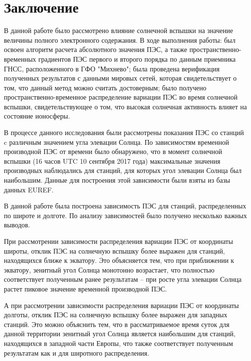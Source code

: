 \documentclass[a4paper]{article}
\begin{document}
\clearpage
\newpage
\section{Заключение}
В данной работе было рассмотрено влияние солнечной вспышки на значение величины полного электронного содержания. В ходе выполнения работы: был освоен алгоритм расчета абсолютного значения ПЭС, а также пространственно-временных градиентов ПЭС первого и второго порядка по данным приемника ГНСС, расположенного в ГФО "Михнево"; была проведена верификация полученных результатов с данными мировых сетей, которая свидетельствует о том, что данный метод можно считать достоверным; было получено пространственно-временное распределение вариации ПЭС во время солнечной вспышки, свидетельствующее о том, что высокая солнечная активность влияет на состояние ионосферы.

В процессе данного исследования были рассмотрены показания ПЭС со станций c различным значением угла элевации Солнца. По зависимостям временной производной ПЭС от времени было обнаружено, что в момент солнечной вспышки (16 часов UTC 10 сентября 2017 года) максимальные значения производных наблюдались для станций, для которых угол элевации Солнца был наибольшим. Данные для построения этой зависимости были взяты из базы данных EUREF. 

В данной работе была построена зависимость ПЭС для станций, распределенных по широте и долготе. По анализу зависимостей было получено несколько важных выводов.

При рассмотрении зависимости распределения вариации ПЭС от координаты широты,
отклик ПЭС на солнечную вспышку более выражен для станций, находящихся ближе к экватору. Это объясняется тем, что при приближении к экватору, зенитный угол Солнца монотонно возрастает, что полностью соответствует полученным ранее результатам -- при росте угла элевации Солнца растет пиковое значение временной производной ПЭС. 

А при рассмотрении зависимости распределения вариации ПЭС от координаты долготы, отклик ПЭС на солнечную вспышку более выражен для западных станций. Это можно объяснить тем, что в рассматриваемое время суток для данной территории зенитный угол Солнца является наибольшим для станций, находящихся в западной части Европы, что также соответствует полученным результатам как и для широтного распределения. 



\newpage
\printbibliography
\end{document}
